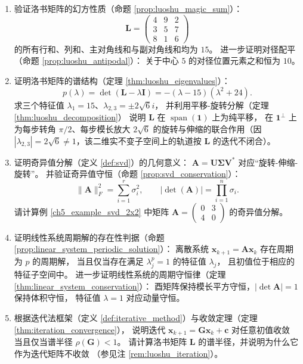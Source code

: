 \begin{enumerate}[leftmargin=3em, label=\textbf{题 \arabic*}]
    \item 验证洛书矩阵的幻方性质（命题 \ref{prop:luoshu_magic_sum}）：
    \[
    \mathbf{L}=\begin{pmatrix}4&9&2\\3&5&7\\8&1&6\end{pmatrix}
    \]
    的所有行和、列和、主对角线和与副对角线和均为 $15$。
    进一步证明对径配平（命题 \ref{prop:luoshu_antipodal}）：
    关于中心 $5$ 的对径位置元素之和恒为 $10$。

    \item 证明洛书矩阵的谱结构（定理 \ref{thm:luoshu_eigenvalues}）：
    \[
    p(\lambda)=\det(\mathbf{L}-\lambda\mathbf{I})
    =-(\lambda-15)(\lambda^2+24).
    \]
    求三个特征值 $\lambda_1=15$、$\lambda_{2,3}=\pm2\sqrt{6}i$，
    并利用平移-旋转分解（定理 \ref{thm:luoshu_decomposition}）
    说明 $\mathbf{L}$ 在 $\operatorname{span}(\mathbf{1})$ 上为纯平移，
    在 $\mathbf{1}^\perp$ 上为每步转角 $\pi/2$、每步模长放大 $2\sqrt{6}$ 的旋转与伸缩的联合作用（因 $|\lambda_{2,3}|=2\sqrt{6}\ne1$，该二维实不变子空间上的轨道按 $\mathbf{L}$ 的迭代不闭合）。

    \item 证明奇异值分解（定义 \ref{def:svd}）的几何意义：
    $\mathbf{A}=\mathbf{U}\boldsymbol{\Sigma}\mathbf{V}^*$ 对应“旋转-伸缩-旋转”。
    并验证奇异值守恒（命题 \ref{prop:svd_conservation}）：
    \[
    \|\mathbf{A}\|_F^2=\sum_{i=1}^{r}\sigma_i^2,\qquad
    |\det(\mathbf{A})|=\prod_{i=1}^{n}\sigma_i.
    \]
    请计算例 \ref{ch5_example_svd_2x2} 中矩阵
    $\mathbf{A}=\begin{pmatrix}0&3\\4&0\end{pmatrix}$ 的奇异值分解。

    \item 证明线性系统周期解的存在性判据（命题 \ref{prop:linear_system_periodic_solution}）：
    离散系统 $\mathbf{x}_{k+1}=\mathbf{A}\mathbf{x}_k$ 存在周期为 $p$ 的周期解，
    当且仅当存在满足 $\lambda_j^p=1$ 的特征值 $\lambda_j$，
    且初值位于相应的特征子空间中。
    进一步证明线性系统的周期守恒律（定理 \ref{thm:linear_system_conservation}）：
    酉矩阵保持模长平方守恒，$|\det\mathbf{A}|=1$ 保持体积守恒，
    特征值 $\lambda=1$ 对应动量守恒。

    \item 根据迭代法框架（定义 \ref{def:iterative_method}）与收敛定理（定理 \ref{thm:iteration_convergence}），
    说明迭代 $\mathbf{x}_{k+1}=\mathbf{G}\mathbf{x}_k+\mathbf{c}$ 对任意初值收敛
    当且仅当谱半径 $\rho(\mathbf{G})<1$。
    请计算洛书矩阵 $\mathbf{L}$ 的谱半径，并说明为什么它作为迭代矩阵不收敛
    （参见注 \ref{rem:luoshu_iteration}）。


\end{enumerate}
